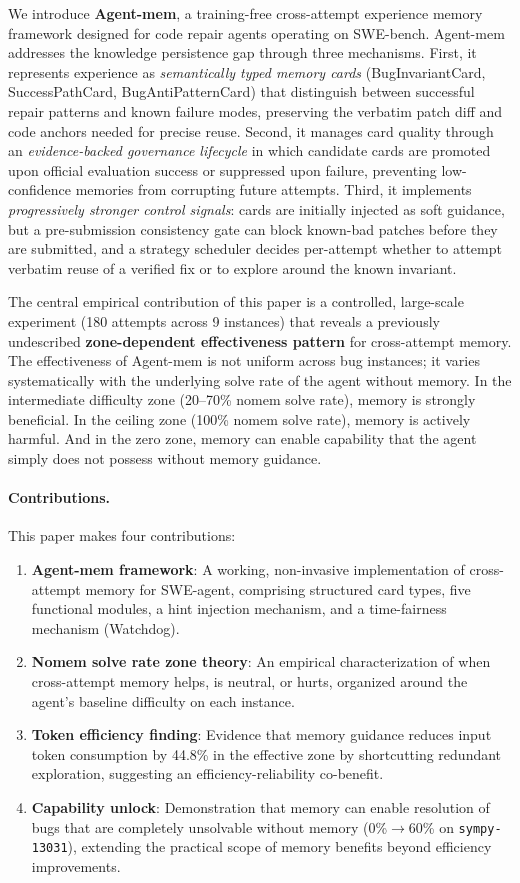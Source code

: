 \documentclass{article}
\begin{document}
We introduce \textbf{Agent-mem}, a training-free cross-attempt experience memory framework designed for code repair agents operating on SWE-bench. Agent-mem addresses the knowledge persistence gap through three mechanisms. First, it represents experience as \emph{semantically typed memory cards} (BugInvariantCard, SuccessPathCard, BugAntiPatternCard) that distinguish between successful repair patterns and known failure modes, preserving the verbatim patch diff and code anchors needed for precise reuse. Second, it manages card quality through an \emph{evidence-backed governance lifecycle} in which candidate cards are promoted upon official evaluation success or suppressed upon failure, preventing low-confidence memories from corrupting future attempts. Third, it implements \emph{progressively stronger control signals}: cards are initially injected as soft guidance, but a pre-submission consistency gate can block known-bad patches before they are submitted, and a strategy scheduler decides per-attempt whether to attempt verbatim reuse of a verified fix or to explore around the known invariant.

The central empirical contribution of this paper is a controlled, large-scale experiment (180 attempts across 9 instances) that reveals a previously undescribed \textbf{zone-dependent effectiveness pattern} for cross-attempt memory. The effectiveness of Agent-mem is not uniform across bug instances; it varies systematically with the underlying solve rate of the agent without memory. In the intermediate difficulty zone (20--70\% nomem solve rate), memory is strongly beneficial. In the ceiling zone (100\% nomem solve rate), memory is actively harmful. And in the zero zone, memory can enable capability that the agent simply does not possess without memory guidance.

\paragraph{Contributions.} This paper makes four contributions:
\begin{enumerate}
    \item \textbf{Agent-mem framework}: A working, non-invasive implementation of cross-attempt memory for SWE-agent, comprising structured card types, five functional modules, a hint injection mechanism, and a time-fairness mechanism (Watchdog).
    \item \textbf{Nomem solve rate zone theory}: An empirical characterization of when cross-attempt memory helps, is neutral, or hurts, organized around the agent's baseline difficulty on each instance.
    \item \textbf{Token efficiency finding}: Evidence that memory guidance reduces input token consumption by 44.8\% in the effective zone by shortcutting redundant exploration, suggesting an efficiency-reliability co-benefit.
    \item \textbf{Capability unlock}: Demonstration that memory can enable resolution of bugs that are completely unsolvable without memory (0\%$\to$60\% on \texttt{sympy-13031}), extending the practical scope of memory benefits beyond efficiency improvements.
\end{enumerate}
\end{document}
